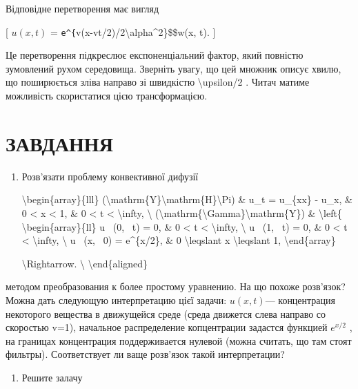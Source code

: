 \documentclass[
]{article}
\begin{document}
{{Відповідне перетворення має вигляд

{[} \(u(x, t)\) =
\texttt{e\^{}\{}v(x-vt/2)/2\textbackslash alpha\^{}2\}\$\$w(x, t). {]}

Це перетворення підкреслює експоненціальний фактор, який повністю
зумовлений рухом середовища. Зверніть увагу, що цей множник описує
хвилю, що поширюється зліва направо зі швидкістю
\textbackslash upsilon/2 . Читач матиме можливість скористатися цією
трансформацією.

\section{ЗАВДАННЯ}\label{ux437ux430ux432ux434ux430ux43dux43dux44f-5}

\begin{enumerate}
\def\labelenumi{\arabic{enumi}.}
\item
  Розв'язати проблему конвективної дифузії

  \textbackslash begin\{array\}\{lll\}
  (\textbackslash mathrm\{Y\}\textbackslash mathrm\{H\}\textbackslash Pi)
  \& u\_t = u\_\{xx\} - u\_x, \& 0 \textless{} x \textless{} 1, \& 0
  \textless{} t \textless{} \textbackslash infty, \textbackslash{}
  (\textbackslash mathrm\{\textbackslash Gamma\}\textbackslash mathrm\{Y\})
  \& \textbackslash left\{ \textbackslash begin\{array\}\{ll\} u ~(0,
  ~t) = 0, \& 0 \textless{} t \textless{} \textbackslash infty,
  \textbackslash{} u ~(1, ~t) = 0, \& 0 \textless{} t \textless{}
  \textbackslash infty, \textbackslash{} u ~(x, ~0) = e\^{}\{x/2\}, \& 0
  \textbackslash leqslant x \textbackslash leqslant 1,
  \textbackslash end\{array\}

  \textbackslash Rightarrow. \textbackslash{}
  \textbackslash end\{aligned\}
\end{enumerate}

методом преобразования к более простому уравнению. На що похоже
розв'язок? Можна дать следующую интерпретацию цієї задачи:
\(u(x, t)\)--- концентрация некоторого вещества в движущейся среде
(среда движется слева направо со скоростью v=1), начальное распределение
копцентрации задастся функцией \(e^{x/2}\) , на границах концентрация
поддерживается нулевой (можна считать, що там стоят фильтры).
Соответствует ли ваще розв'язок такой интерпретации?

\begin{enumerate}
\def\labelenumi{\arabic{enumi}.}
\setcounter{enumi}{1}
\item
  Решите залачу


\end{enumerate}}}
\end{document}
